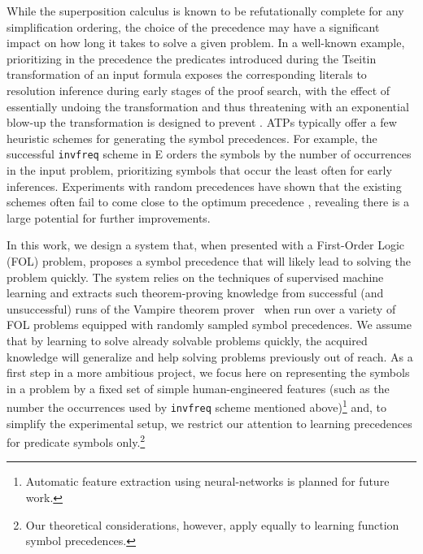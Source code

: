 While the superposition calculus is known \cite{DBLP:journals/logcom/BachmairG94} to be refutationally complete for any simplification ordering, the choice of the precedence may have a significant impact on how long it takes to solve a given problem.
In a well-known example, prioritizing in the precedence the predicates introduced during the Tseitin transformation of an input formula \cite{Tseitin1983} exposes the corresponding literals to resolution inference during early stages of the proof search,
with the effect of essentially undoing the transformation and thus threatening with an exponential blow-up
the transformation is designed to prevent \cite{Reger2016}.
%
ATPs typically offer a few heuristic schemes for generating the symbol precedences.
For example, the successful \texttt{invfreq} scheme in E \cite{E-manual} orders the symbols by the number of occurrences in the input problem,
prioritizing symbols that occur the least often for early inferences.
Experiments with random precedences have shown that the existing schemes often fail to come close to the optimum precedence \cite{RegerSuda2017}, revealing there is a large potential for further improvements.

In this work, we design a system that, when presented with a First-Order Logic (FOL) problem,
proposes a symbol precedence that will likely lead to solving the problem quickly.
The system relies on the techniques of supervised machine learning and extracts
such theorem-proving knowledge from successful (and unsuccessful) runs of 
the Vampire theorem prover~\cite{Kovacs2013} when run over a variety of FOL problems equipped
with randomly sampled symbol precedences. 
We assume that by learning to solve already solvable problems quickly,
the acquired knowledge will generalize and help solving problems previously out of reach.
As a first step in a more ambitious project,
we focus here on representing the symbols in a problem by a fixed set of simple human-engineered features
(such as the number the occurrences used by \texttt{invfreq} scheme mentioned above)\footnote{Automatic
feature extraction using neural-networks is planned for future work.}
and, to simplify the experimental setup, we restrict our attention to learning precedences for predicate symbols only.\footnote{
Our theoretical considerations, however, apply equally to learning function symbol precedences.}

